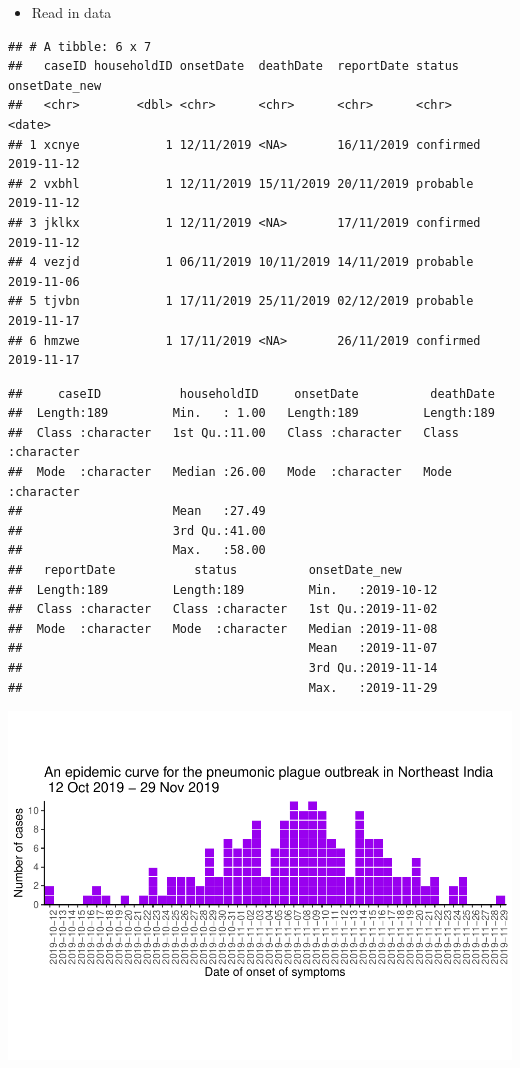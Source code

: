\documentclass[
]{article}
\providecommand{\tightlist}{%
  \setlength{\itemsep}{0pt}\setlength{\parskip}{0pt}}
\begin{document}
\begin{itemize}
\tightlist
\item
  Read in data
\end{itemize}

\begin{verbatim}
## # A tibble: 6 x 7
##   caseID householdID onsetDate  deathDate  reportDate status    onsetDate_new
##   <chr>        <dbl> <chr>      <chr>      <chr>      <chr>     <date>       
## 1 xcnye            1 12/11/2019 <NA>       16/11/2019 confirmed 2019-11-12   
## 2 vxbhl            1 12/11/2019 15/11/2019 20/11/2019 probable  2019-11-12   
## 3 jklkx            1 12/11/2019 <NA>       17/11/2019 confirmed 2019-11-12   
## 4 vezjd            1 06/11/2019 10/11/2019 14/11/2019 probable  2019-11-06   
## 5 tjvbn            1 17/11/2019 25/11/2019 02/12/2019 probable  2019-11-17   
## 6 hmzwe            1 17/11/2019 <NA>       26/11/2019 confirmed 2019-11-17
\end{verbatim}

\begin{verbatim}
##     caseID           householdID     onsetDate          deathDate        
##  Length:189         Min.   : 1.00   Length:189         Length:189        
##  Class :character   1st Qu.:11.00   Class :character   Class :character  
##  Mode  :character   Median :26.00   Mode  :character   Mode  :character  
##                     Mean   :27.49                                        
##                     3rd Qu.:41.00                                        
##                     Max.   :58.00                                        
##   reportDate           status          onsetDate_new       
##  Length:189         Length:189         Min.   :2019-10-12  
##  Class :character   Class :character   1st Qu.:2019-11-02  
##  Mode  :character   Mode  :character   Median :2019-11-08  
##                                        Mean   :2019-11-07  
##                                        3rd Qu.:2019-11-14  
##                                        Max.   :2019-11-29
\end{verbatim}

\includegraphics{Plague_SitRep_files/figure-latex/unnamed-chunk-2-1.pdf}
\end{document}
